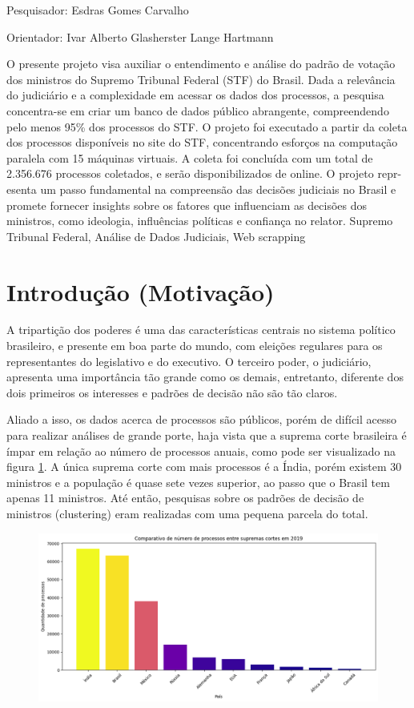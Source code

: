     {
        \noindent Pesquisador: Esdras Gomes Carvalho

        \noindent Orientador: Ivar Alberto Glasherster Lange Hartmann
    }
    {O presente projeto visa auxiliar o entendimento e análise do padrão de votação dos ministros do Supremo Tribunal Federal (STF) do Brasil. Dada a relevância do judiciário e a complexidade em acessar os dados dos processos, a pesquisa concentra-se em criar um banco de dados público abrangente, compreendendo pelo menos 95\% dos processos do STF. O projeto foi executado a partir da coleta dos processos disponíveis no site do STF, concentrando esforços na computação paralela com 15 máquinas virtuais. A coleta foi concluída com um total de 2.356.676 processos coletados, e serão disponibilizados de online. O projeto repr-esenta um passo fundamental na compreensão das decisões judiciais no Brasil e promete fornecer insights sobre os fatores que influenciam as decisões dos ministros, como ideologia, influências políticas e confiança no relator.
    }
    {Supremo Tribunal Federal, Análise de Dados Judiciais, Web scrapping}


\section{Introdução (Motivação)}

A tripartição dos poderes é uma das características centrais no sistema político brasileiro, e presente em boa parte do mundo, com eleições regulares para os representantes do legislativo e do executivo. O terceiro poder, o judiciário, apresenta uma importância tão grande como os demais, entretanto, diferente dos dois primeiros os interesses e padrões de decisão não são tão claros.

Aliado a isso, os dados acerca de processos são públicos, porém de difícil acesso para realizar análises de grande porte, haja vista que a suprema corte brasileira é ímpar em relação ao número de processos anuais, como pode ser visualizado na figura \ref{fig_1}. A única suprema corte com mais processos é a Índia, porém existem 30 ministros e a população é quase sete vezes superior, ao passo que o Brasil tem apenas 11 ministros. Até então, pesquisas sobre os padrões de decisão de ministros (clustering) eram realizadas com uma pequena parcela do total. 

\begin{figure}
    \centering
    \caption{}
    \includegraphics[width = .9\linewidth]{relatorios/stf/imagens/img2.png}
    \label{fig_1}
\end{figure}

